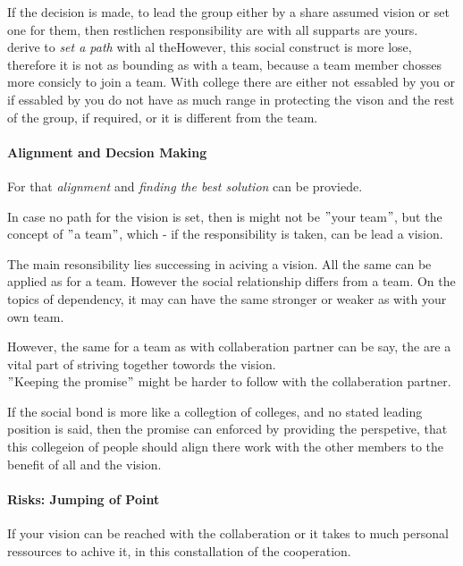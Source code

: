 If the decision is made, to lead the group either by a share assumed vision or set one for them, then restlichen responsibility are with all supparts are yours.\\




derive to \textit{set a path} with al theHowever, this social construct is more lose, therefore it is not as bounding as with a team, because a team member chosses more consicly to join a team. With college there are either not essabled by you or if essabled by you do not have as much range in protecting the vison and the rest of the group, if required, or it is different from the team.\\



\paragraph{Alignment and Decsion Making}
For that \textit{alignment} and \textit{finding the best solution} can be proviede. 

In case no path for the vision is set, then is might not be $"$your team$"$, but the concept of $"$a team$"$, which - if the responsibility is taken, can be lead a vision.

The main resonsibility lies  successing in aciving a vision.
All the same can be applied as for a team. However the social relationship differs from a team. 
On the topics of dependency, it may can have the same stronger or weaker as with your own team. 

However, the same for a team as with collaberation partner can be say, 
the are a vital part of striving together towords the vision.\\

$"$Keeping the promise$"$ might be harder to follow with the collaberation partner.

If the social bond is more like a collegtion of colleges, and no stated leading position is said, then the promise can enforced by providing the perspetive, that this collegeion of people should align there work with the other members to the benefit of all and the vision.

\paragraph{Risks: Jumping of Point}

If your vision can be reached with the collaberation or it takes to much personal ressources to achive it, in this constallation of the cooperation.\\

